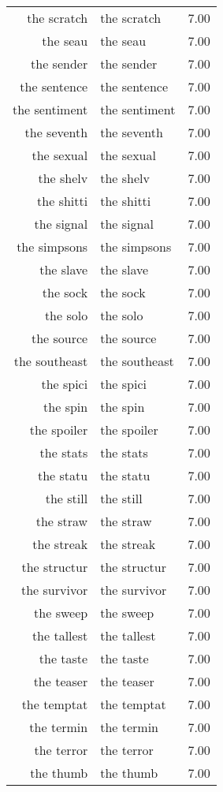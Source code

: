 \begin{table}[ht]
\begin{tabular}{rlr}
  the scratch & the scratch & 7.00 \\ 
  the seau & the seau & 7.00 \\ 
  the sender & the sender & 7.00 \\ 
  the sentence & the sentence & 7.00 \\ 
  the sentiment & the sentiment & 7.00 \\ 
  the seventh & the seventh & 7.00 \\ 
  the sexual & the sexual & 7.00 \\ 
  the shelv & the shelv & 7.00 \\ 
  the shitti & the shitti & 7.00 \\ 
  the signal & the signal & 7.00 \\ 
  the simpsons & the simpsons & 7.00 \\ 
  the slave & the slave & 7.00 \\ 
  the sock & the sock & 7.00 \\ 
  the solo & the solo & 7.00 \\ 
  the source & the source & 7.00 \\ 
  the southeast & the southeast & 7.00 \\ 
  the spici & the spici & 7.00 \\ 
  the spin & the spin & 7.00 \\ 
  the spoiler & the spoiler & 7.00 \\ 
  the stats & the stats & 7.00 \\ 
  the statu & the statu & 7.00 \\ 
  the still & the still & 7.00 \\ 
  the straw & the straw & 7.00 \\ 
  the streak & the streak & 7.00 \\ 
  the structur & the structur & 7.00 \\ 
  the survivor & the survivor & 7.00 \\ 
  the sweep & the sweep & 7.00 \\ 
  the tallest & the tallest & 7.00 \\ 
  the taste & the taste & 7.00 \\ 
  the teaser & the teaser & 7.00 \\ 
  the temptat & the temptat & 7.00 \\ 
  the termin & the termin & 7.00 \\ 
  the terror & the terror & 7.00 \\ 
  the thumb & the thumb & 7.00 \\ 

\end{tabular}
\end{table}
